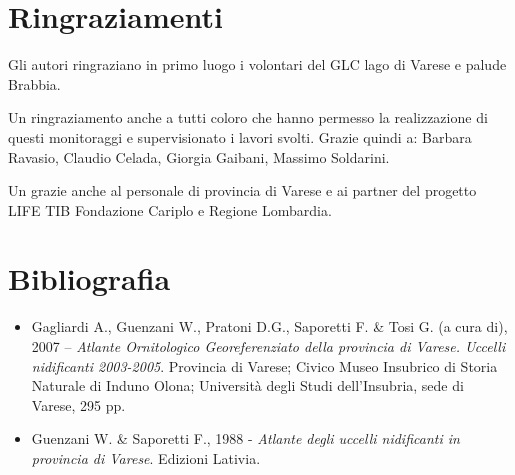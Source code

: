 \section*{Ringraziamenti}

Gli autori ringraziano in primo luogo i volontari del GLC lago di Varese
e palude Brabbia.

Un ringraziamento anche a tutti coloro che hanno permesso la
realizzazione di questi monitoraggi e supervisionato i lavori svolti.
Grazie quindi a: Barbara Ravasio, Claudio Celada, Giorgia Gaibani,
Massimo Soldarini. 

Un grazie anche al personale di provincia di Varese e ai partner del
progetto LIFE TIB Fondazione Cariplo e Regione Lombardia.

\section*{Bibliografia}
\begin{itemize}\itemsep0pt
	\item Gagliardi A., Guenzani W., Pratoni D.G., Saporetti F. \& Tosi G. (a cura
di), 2007 {}-- \textit{Atlante Ornitologico Georeferenziato della
provincia di Varese. Uccelli nidificanti 2003-2005}. Provincia di
Varese; Civico Museo Insubrico di Storia Naturale di Induno Olona;
Universit\`a degli Studi dell{\textquoteright}Insubria, sede di Varese,
295 pp.

	\item Guenzani W. \& Saporetti F., 1988 {}- \textit{Atlante degli uccelli
nidificanti in provincia di Varese}. Edizioni Lativia.
\end{itemize}

